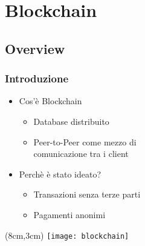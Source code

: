 \section{Blockchain}
\subsection{Overview}
\begin{frame}
  \frametitle{Introduzione}

  \begin{itemize}
   \item<1-> Cos'è Blockchain
   \begin{itemize}
    \item Database distribuito
    \item Peer-to-Peer come mezzo di \\
    comunicazione tra i client
   \end{itemize}

   \item<2-> Perchè è stato ideato?
   \begin{itemize}
    \item Transazioni senza terze parti
    \item Pagamenti anonimi
   \end{itemize}

  \end{itemize}

 \begin{textblock*}{5cm}(8cm,3cm)
  \texttt{[image: blockchain]}
 \end{textblock*}

\end{frame}
